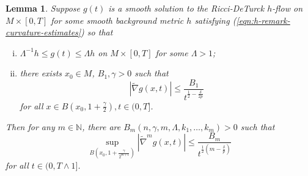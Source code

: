 \documentclass[12pt]{amsart}
\newcommand{\hdel}{\tilde{\nabla}}
\newtheorem{lma}[thm]{Lemma}
\theoremstyle{remark}
\numberwithin{equation}{section}
\begin{document}
\begin{lma}\label{lem:estimates-bootstrap}
    Suppose $g(t)$ is a smooth solution to the Ricci-DeTurck $h$-flow on $M \times [0,T]$ for some smooth background metric $h$ satisfying (\ref{eqn:h-remark-curvature-estimates}) %
    so that
    \begin{enumerate}[(i)]
        \item $\Lambda^{-1}h \leq g(t) \leq \Lambda h$ on $M\times[0,T]$ for some $\Lambda > 1$;
        \item there exists $x_0\in M$, $B_1,\gamma>0$ such that 
        \begin{equation*}
            |\hdel g(x,t)| \leq \frac{B_1}{t^{\frac{1}{2}-\frac{\delta}{2p}}}
        \end{equation*}
        for all $x \in B\left(x_0, 1 + \frac{\gamma}{2}\right), t \in (0, T]$. 
    \end{enumerate}
 Then for any $m\in \mathbb{N}$, there are 
       $ B_m(n,\gamma, m,\Lambda,k_1,\dots,k_m) > 0$
    such that 
    \begin{equation}\label{eqn:bootstrap-higher-order-interior-estimate}
        \sup\limits_{B\left(x_0, 1 + \frac{\gamma}{2^{m+1}}\right)} |\hdel^m g(x,t)| \leq \frac{B_m}{t^{\frac{1}{2}(m-\frac{\delta}{p})}}
    \end{equation}
    for all $t \in (0, T\wedge 1]$. %
\end{lma}
\end{document}
